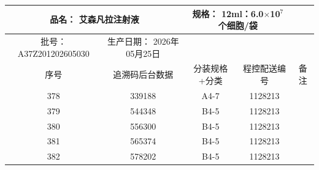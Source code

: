 \documentclass[UTF8,10pt,a4paper,fontset=fandol]{ctexart}
\newcommand{\fieldvalue}[1]{#1}
\begin{document}
\newpage

\begin{center}
\begin{tabular}{|c|c|c|c|c|}
\hline
\multicolumn{2}{|c|}{品名：%
\fieldvalue{艾森凡拉注射液}} &
\multicolumn{2}{c|}{规格：%
\fieldvalue{12ml：6.0$\times$10$^{7}$个细胞/袋}} &
\\ \hline
批号：%
\fieldvalue{A37Z201202605030} &
生产日期：%
\fieldvalue{2026年05月25日} &
\multicolumn{2}{c|}{} \\ \hline
序号 & 追溯码后台数据 & 分装规格+分类 & 程控配送编号 & 备注 \\ \hline

\fieldvalue{378} &
\fieldvalue{339188} &
\fieldvalue{A4-7} &
\fieldvalue{1128213} & \\ \hline

\fieldvalue{379} &
\fieldvalue{544348} &
\fieldvalue{B4-5} &
\fieldvalue{1128213} & \\ \hline

\fieldvalue{380} &
\fieldvalue{556300} &
\fieldvalue{B4-5} &
\fieldvalue{1128213} & \\ \hline

\fieldvalue{381} &
\fieldvalue{565374} &
\fieldvalue{B4-5} &
\fieldvalue{1128213} & \\ \hline

\fieldvalue{382} &
\fieldvalue{578202} &
\fieldvalue{B4-5} &
\fieldvalue{1128213} & \\ \hline


\end{tabular}
\end{center}
\end{document}
